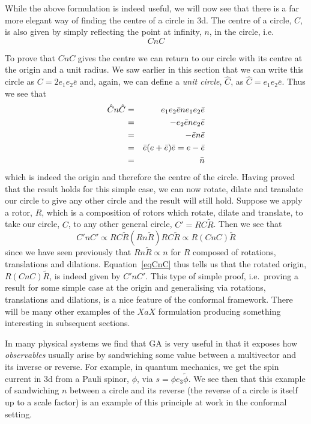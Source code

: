 While the above formulation is indeed useful, we will now see
that there is a far more elegant way of finding the
centre of a circle in 3d. The centre of a circle, $C$,  is also given 
by simply reflecting the point at infinity, $n$, in the
circle, i.e.
%
\begin{equation}
CnC
\end{equation}

To prove that $CnC$ gives the centre we can return to our circle
with its centre at the origin and a unit radius. We saw earlier in this section that we can
write this circle as  $C= 2e_1e_2\bar{e}$ and, again, we can
define a \emph{unit circle}, $\hat{C}$, as $\hat{C}= e_1e_2\bar{e}$. 
Thus we see that
 \begin{eqnarray}
 \hat{C}n\hat{C} &  = &  e_1e_2\bar{e}ne_1e_2\bar{e} \nonumber \\
        & = &  -e_2\bar{e}n e_2 \bar{e} \nonumber \\
        & = &  -\bar{e}n\bar{e}  \nonumber \\
        & = & \bar{e}(e + \bar{e})\bar{e} = e - \bar{e} \nonumber
        \\
        & = &  \bar{n}
\end{eqnarray}
%
which is indeed the origin and therefore the centre of
the circle. Having proved that the result holds for this
simple case, we can now rotate, dilate and translate our
circle to give any other circle and the result will still
hold. Suppose we apply a rotor, $R$, which is a
composition of rotors which rotate, dilate and translate,
to take our circle, $C$, to any other general circle,
$C'=R C \tilde{R}$. Then we see that
%
\begin{equation}
C'nC' \propto RC\tilde{R}(Rn\tilde{R}) RC\tilde{R} \propto
R(CnC)\tilde{R} \label{eqCnC}
\end{equation}
%
since we have seen previously that $Rn\tilde{R} \propto n$ for $R$
composed of rotations, translations and dilations.
Equation~\ref{eqCnC} thus tells us that the rotated origin,
$R(CnC)\tilde{R}$, is indeed given by $C'nC'$. This type of simple
proof, i.e.\ proving a result for some simple case at the origin and
generalising via rotations, translations and dilations, is a nice
feature of the conformal framework. There will be many other examples
of the $XaX$ formulation producing something interesting in
subsequent sections.

In many physical systems we find that GA is very useful in that
it exposes how {\em observables} usually arise by sandwiching some
value between a multivector and its inverse or reverse.
For example, in quantum mechanics, we get the spin current in 3d
from a Pauli spinor, $\phi$, via $s = \phi e_3 \tilde{\phi}$. We see then
that this example of sandwiching $n$ between a circle and its
reverse (the reverse of a circle is itself up to a scale factor)
is an example of this principle at work in the conformal setting.

